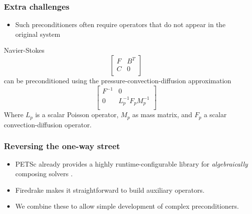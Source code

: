 \documentclass[presentation]{beamer}
\begin{document}
\begin{frame}
  \frametitle{Extra challenges}
  \begin{itemize}
  \item Such preconditioners often require operators that do not
    appear in the original system
  \end{itemize}
  \begin{block}{Navier-Stokes}
    \begin{equation*}
      \begin{bmatrix}
        F & B^T\\
        C & 0 \\
      \end{bmatrix}
    \end{equation*}
    can be preconditioned using the pressure-convection-diffusion approximation
    \begin{equation*}
      \begin{bmatrix}
        F^{-1} & 0\\
        0 & L_p^{-1}F_p M_p^{-1}\\
      \end{bmatrix}
    \end{equation*}
    Where $L_p$ is a scalar Poisson operator, $M_p$ as mass matrix,
    and $F_p$ a scalar convection-diffusion operator.
  \end{block}
\end{frame}

\begin{frame}
  \frametitle{Reversing the one-way street}
  \begin{itemize}
  \item PETSc already provides a highly runtime-configurable library
    for \emph{algebraically} composing solvers \parencite{Brown:2012}.

  \item Firedrake makes it straightforward to build auxiliary
    operators.

  \item We combine these to allow simple development of complex
    preconditioners.
  \end{itemize}
\end{frame}
\end{document}
